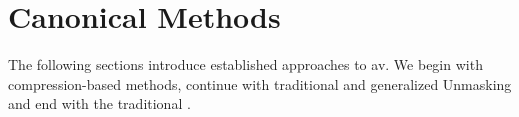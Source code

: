 \section{Canonical Methods}

The following sections introduce established approaches to \ac{av}.
We begin with compression-based methods, continue with traditional and generalized Unmasking and end with the traditional \impAppr{}.




  

